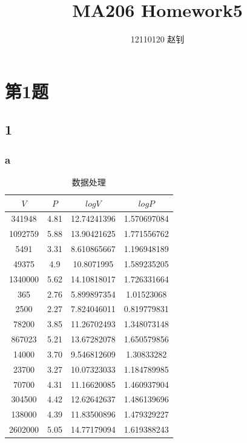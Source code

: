 \documentclass{article}
\title{MA206 Homework5}
\author{12110120 赵钊}
\begin{document}
\maketitle


\section{第1题}

\subsection{1}
\subsubsection{a}
\begin{table}[!h]
\begin{center}
\begin{tabular}{|c|c|c|c|}
    \hline
    $V$ & $P$ & $log V$ & $log P$ \\
    \hline
    341948 &	4.81	&12.74241396	&1.570697084\\
    \hline
1092759 &	5.88 &	13.90421625 &	1.771556762\\
\hline
5491 &	3.31 &	8.610865667 &	1.196948189\\
\hline
49375 &	4.9	 & 10.8071995 &	1.589235205\\
\hline
1340000 &	5.62 &	14.10818017 &	1.726331664\\
\hline
365 &	2.76 &	5.899897354 &	1.01523068\\
\hline
2500	& 2.27	 & 7.824046011 &	0.819779831\\
\hline
78200 &	3.85 &	11.26702493 &	1.348073148\\
\hline
867023 &	5.21 &	13.67282078 &	1.650579856\\
\hline
14000 &	3.70 & 	9.546812609 &	1.30833282\\
\hline
23700	 & 3.27 &	10.07323033 &	1.184789985\\
\hline
70700 &	4.31 &	11.16620085 &	1.460937904\\
\hline
304500 &	4.42 &	12.62642637 &	1.486139696\\
\hline 
138000 &	4.39 &	11.83500896 &	1.479329227\\
\hline
2602000 &	5.05 &	14.77179094 &	1.619388243\\
\hline
\end{tabular}
\caption{\label{demo-table}数据处理}
\end{center}
\end{table}
\end{document}
